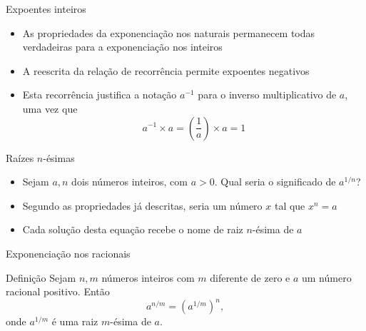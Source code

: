 \begin{frame}[fragile]{Expoentes inteiros}

    \begin{itemize}
        \item As propriedades da exponenciação nos naturais permanecem todas verdadeiras para a exponenciação nos inteiros

        \item A reescrita da relação de recorrência permite expoentes negativos

        \item Esta recorrência justifica a notação $a^{-1}$ para o inverso multiplicativo de $a$, uma vez que 
$$
a^{-1} \times a = \left(\frac{1}{a}\right) \times a = 1
$$
    \end{itemize}

\end{frame}

\begin{frame}[fragile]{Raízes $n$-ésimas}

    \begin{itemize}
        \item Sejam $a, n$ dois números inteiros, com $a > 0$. Qual seria o significado de $a^{1/n}$? 

        \item Segundo as propriedades já descritas, seria um número $x$ tal que $x^n = a$

        \item Cada solução desta equação recebe o nome de raiz $n$-ésima de $a$
    \end{itemize}

\end{frame}

\begin{frame}[fragile]{Exponenciação nos racionais}

    \begin{block}{Definição}
Sejam $n, m$ números inteiros com $m$ diferente de zero e $a$ um número racional positivo. Então
$$
a^{n/m} = (a^{1/m})^n,
$$
onde $a^{1/m}$ é uma raiz $m$-ésima de $a$.
    \end{block}

\end{frame}

